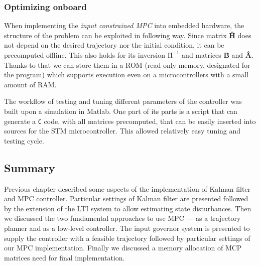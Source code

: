 \subsubsection{Optimizing onboard}

When implementing the \emph{input constrained MPC} into embedded hardware, the structure of the problem can be exploited in following way. Since matrix \textbf{\^H} does not depend on the desired trajectory nor the initial condition, it can be precomputed offline. This also holds for its inversion $\textbf{\^H}^{-1}$ and matrices \textbf{\^B} and \textbf{\^A}. Thanks to that we can store them in a ROM (read-only memory, designated for the program) which supports execution even on a microcontrollers with a small amount of RAM.

The workflow of testing and tuning different parameters of the controller was built upon a simulation in Matlab. One part of its parts is a script that can generate a \verb!C! code, with all matrices precomputed, that can be easily inserted into sources for the STM microcontroller. This allowed relatively easy tuning and testing cycle.

\subsection{Summary}

Previous chapter described some aspects of the implementation of Kalman filter and MPC controller. Particular settings of Kalman filter are presented followed by the extension of the LTI system to allow estimating state disturbances. Then we discussed the two fundamental approaches to use MPC --- as a trajectory planner and as a low-level controller. The input governor system is presented to supply the controller with a feasible trajectory followed by particular settings of our MPC implementation. Finally we discussed a memory allocation of MCP matrices need for final implementation.